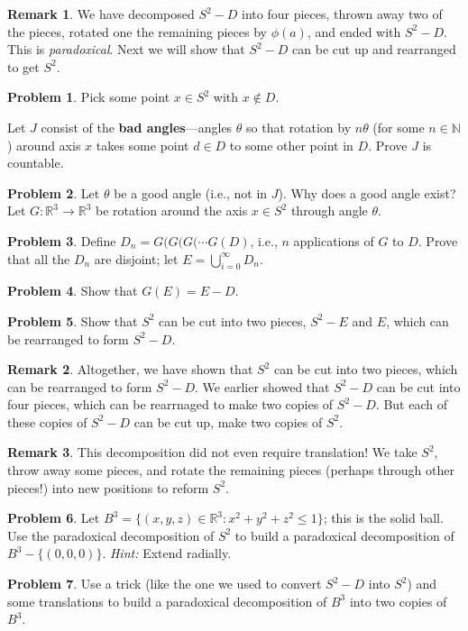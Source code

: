 \documentclass[12pt]{article}
\newcommand{\R}{\mathbb{R}}
\newcommand{\N}{\mathbb{N}}
\theoremstyle{definition}
\newtheorem{problem}{Problem}
\newtheorem*{remark}{Remark}
\begin{document}
\begin{remark}
  We have decomposed $S^2 - D$ into four pieces, thrown away two of
  the pieces, rotated one the remaining pieces by $\phi(a)$, and ended
  with $S^2 - D$.  This is \textit{paradoxical}.  Next we will show
  that $S^2 - D$ can be cut up and rearranged to get $S^2$.
\end{remark}

\begin{problem}
Pick some point $x \in S^2$ with $x \not\in D$.

Let $J$ consist of the \textbf{bad angles}---angles $\theta$ so that
rotation by $n \theta$ (for some $n \in \N$) around axis $x$ takes some point $d \in D$ to
some other point in $D$.  Prove $J$ is countable.
\end{problem}

\begin{problem}
  Let $\theta$ be a good angle (i.e., not in $J$).  Why does a good
  angle exist?  Let $G : \R^3 \to \R^3$ be rotation around the axis $x \in S^2$
  through angle $\theta$.
\end{problem}

\begin{problem}
Define $D_n = G(G(G(\cdots G(D)$, i.e., $n$ applications of $G$ to $D$.  Prove that all the $D_n$ are disjoint; let $E = \bigcup_{i = 0}^\infty D_n$.
\end{problem}

\begin{problem}
Show that $G(E) = E - D$.
\end{problem}

\begin{problem}
Show that $S^2$ can be cut into two pieces, $S^2 - E$ and $E$, which can be rearranged to form $S^2 - D$.
\end{problem}

\begin{remark}
  Altogether, we have shown that $S^2$ can be cut into two pieces,
  which can be rearranged to form $S^2 - D$.  We earlier showed that
  $S^2 - D$ can be cut into four pieces, which can be rearrnaged to
  make two copies of $S^2 - D$.  But each of these copies of $S^2 - D$
  can be cut up, make two copies of $S^2$.
\end{remark}

\begin{remark}
  This decomposition did not even require translation!  We take $S^2$,
  throw away some pieces, and rotate the remaining pieces (perhaps
  through other pieces!) into new positions to reform $S^2$.
\end{remark}

\begin{problem}
  Let $B^3 = \{(x,y,z) \in \R^3 : x^2 + y^2 + z^2 \leq 1 \}$; this is
  the solid ball.  Use the paradoxical decomposition of $S^2$ to build
  a paradoxical decomposition of $B^3 - \{ (0,0,0) \}$.  \textit{Hint:} Extend radially.
\end{problem}

\begin{problem}
  Use a trick (like the one we used to convert $S^2 - D$ into $S^2$)
  and some translations to build a paradoxical decomposition of $B^3$
  into two copies of $B^3$.
\end{problem}
\end{document}
